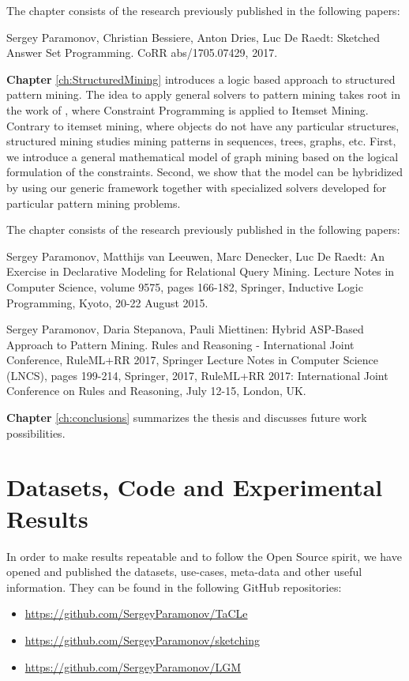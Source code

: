 The chapter consists of the research previously published in the following papers:
\begin{addmargin}[2em]{2em}
  Sergey Paramonov, Christian Bessiere, Anton Dries, Luc De Raedt:
  Sketched Answer Set Programming. CoRR abs/1705.07429, 2017.
\end{addmargin}


\textbf{Chapter} \ref{ch:StructuredMining} introduces a logic
based approach to structured pattern mining. The idea to apply general
solvers to pattern mining takes root in the work of
\textcite{declrativeapproach}, where Constraint Programming is applied to
Itemset Mining. Contrary to itemset mining, where objects do not have
any particular structures, structured mining studies mining patterns
in sequences, trees, graphs, etc. First, we introduce a general
mathematical model of graph mining based on the logical formulation of
the constraints. Second, we show that the model can be hybridized by
using our generic framework together with specialized solvers
developed for particular pattern mining problems.

The chapter consists of the research previously published in the following papers:
\begin{addmargin}[2em]{2em}
Sergey Paramonov, Matthijs van Leeuwen, Marc Denecker, Luc De Raedt:
An Exercise in Declarative Modeling for Relational Query Mining.
Lecture Notes in Computer Science, volume 9575, pages 166-182,
    Springer, Inductive Logic Programming, Kyoto, 20-22 August 2015.



Sergey Paramonov, Daria Stepanova, Pauli Miettinen:
Hybrid ASP-Based Approach to Pattern Mining.  
Rules and Reasoning - International Joint Conference, RuleML+RR 2017,
    Springer Lecture Notes in Computer Science (LNCS), pages 199-214,
    Springer, 2017, RuleML+RR 2017: International Joint Conference on
    Rules and Reasoning, July 12-15, London, UK.
\end{addmargin}

\textbf{Chapter} \ref{ch:conclusions} summarizes the thesis and
discusses future work possibilities.

\section{Datasets, Code and Experimental Results}
In order to make results repeatable and to follow the Open Source
spirit, we have opened and published the datasets, use-cases,
meta-data and other useful information.
They can be found in the following GitHub repositories:
\begin{itemize}
\item \url{https://github.com/SergeyParamonov/TaCLe}
\item \url{https://github.com/SergeyParamonov/sketching}
\item \url{https://github.com/SergeyParamonov/LGM}
\end{itemize}
\cleardoublepage
